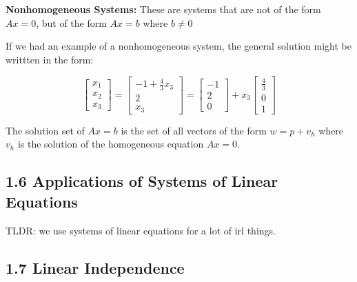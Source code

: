 \documentclass[12pt]{article}
\newcommand{\definition}[2]{
  \noindent\textbf{#1:} #2
}
\begin{document}
\definition{Nonhomogeneous Systems}{These are systems that are not of the form $Ax=0$, but of the form $Ax=b$ where \(b \neq 0\)}
If we had an example of a nonhomogeneous system, the general solution might be writtten in the form:

\[
    \begin{bmatrix}
        x_1\\x_2\\x_3
    \end{bmatrix} =
    \begin{bmatrix}
        -1 + \frac{4}{3}x_3\\2\\x_3
    \end{bmatrix}
     = 
     \begin{bmatrix}
         -1\\2\\0
    \end{bmatrix} + x_3
    \begin{bmatrix}
        \frac{4}{3}\\0\\1
    \end{bmatrix}
\]

\begin{note}
    The solution set of $Ax=b$ is the set of all vectors of the form $w=p+v_h$ where $v_h$ is the solution of the homogeneous equation $Ax=0$.
\end{note}


\subsection*{1.6 Applications of Systems of Linear Equations}
TLDR: we use systems of linear equations for a lot of irl things.

\subsection*{1.7 Linear Independence}
\end{document}
